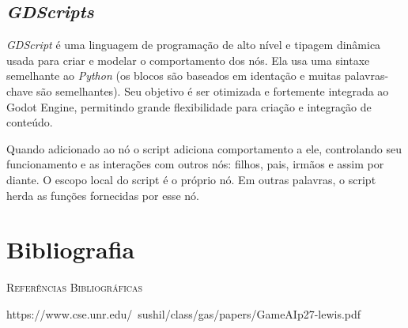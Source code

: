 \subsection{\textit{GDScripts}}

\textit{GDScript} é uma linguagem de programação de alto nível e tipagem 
dinâmica usada para criar e modelar o comportamento dos nós.
Ela usa uma sintaxe semelhante ao \textit{Python} (os blocos são 
baseados em identação e muitas palavras-chave são semelhantes). 
Seu objetivo é ser otimizada e fortemente integrada ao Godot Engine, permitindo
grande flexibilidade para criação e integração de conteúdo.

Quando adicionado ao nó o script adiciona comportamento a ele, controlando seu
funcionamento e as interações com outros nós: filhos, pais, irmãos e assim por 
diante. O escopo local do script é o próprio nó. Em outras palavras, o script 
herda as funções fornecidas por esse nó.

\section{Bibliografia}

\textsc{Referências Bibliográficas} 

\textnormal{https://www.cse.unr.edu/~sushil/class/gas/papers/GameAIp27-lewis.pdf}
